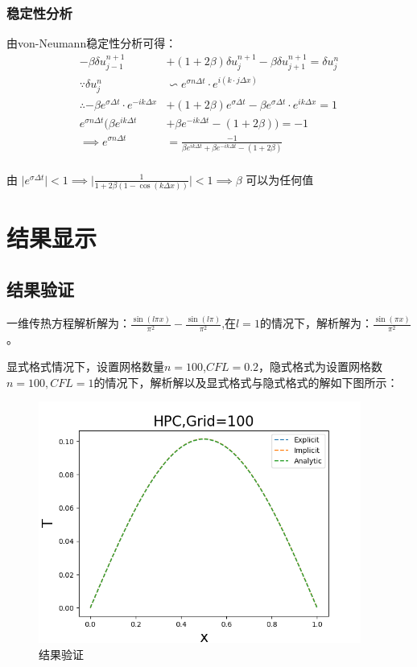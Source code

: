 \documentclass[
	20pt%
]{SUSTechHomework}
\begin{document}
\subsubsection{稳定性分析}

由von-Neumann稳定性分析可得：
$$
\begin{aligned}
-\beta \delta u_{j-1}^{n+1} &+ (1+2\beta)\delta u_j^{n+1} - \beta \delta u_{j+1}^{n+1} = \delta u_j^n\\
\because \delta u_j^n &\backsim e^{\sigma n \Delta t} \cdot e^{i(k \cdot j \Delta x)}\\
\therefore -\beta e^{\sigma \Delta t} \cdot e^{-ik\Delta x} &+ (1+2\beta)e^{\sigma \Delta t} - \beta e^{\sigma \Delta t} \cdot e^{i k \Delta x} = 1\\
e^{\sigma n \Delta t}(\beta e^{i k \Delta t} &+ \beta e^{-i k \Delta t} - (1+2\beta)) = -1\\
\implies e^{\sigma n \Delta t} &= \frac{-1}{\beta e^{i k \Delta t} + \beta e^{-i k \Delta t} - (1+2\beta)}\\
\end{aligned}
$$

由 $\lvert e^{\sigma \Delta t} \rvert < 1 \implies \lvert \frac{1}{1 + 2\beta (1-\cos(k \Delta x))} \rvert < 1 \implies \beta$ 可以为任何值

\section{结果显示}
\subsection{结果验证}
\qquad 一维传热方程解析解为：$\frac{\sin(l \pi x)}{\pi^2} - \frac{\sin(l \pi)}{\pi^2} $,在$l=1$的情况下，解析解为：$\frac{\sin(\pi x)}{\pi^2}$。

\qquad 显式格式情况下，设置网格数量$n=100$,$CFL=0.2$，隐式格式为设置网格数$n=100,CFL=1$的情况下，解析解以及显式格式与隐式格式的解如下图所示：
\begin{figure}[hb]
    \centering
    \includegraphics[width=300pt]{img/n=100.png}
    \caption{结果验证}
    \label{fig:figure1}
\end{figure}
\end{document}

